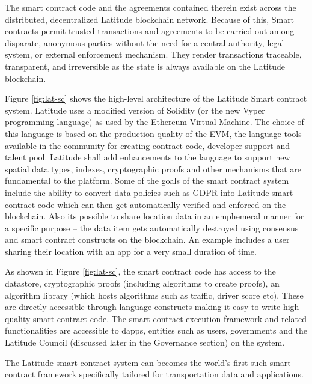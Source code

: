 The smart contract code and the agreements contained therein exist across the distributed, decentralized Latitude
blockchain network.  Because of this, Smart contracts permit trusted transactions and agreements to be carried out among
disparate, anonymous parties without the need for a central authority, legal system, or external enforcement mechanism.
They render transactions traceable, transparent, and irreversible as the state is always available on the Latitude
blockchain.

Figure \ref{fig:lat-sc} shows the high-level architecture of the Latitude Smart contract system. Latitude uses a
modified version of Solidity (or the new Vyper programming language) as used by the Ethereum Virtual Machine. The choice
of this language is based on the production quality of the EVM, the language tools available in the community for
creating contract code, developer support and talent pool. Latitude shall add enhancements to the language to support
new spatial data types, indexes, cryptographic proofs and other mechanisms that are fundamental to the platform. Some of
the goals of the smart contract system include the ability to convert data policies such as GDPR \cite{gdpr} into
Latitude smart contract code which can then get automatically verified and enforced on the blockchain.  Also its
possible to share location data in an emphemeral manner for a specific purpose -- the data item gets automatically
destroyed using consensus and smart contract constructs on the blockchain. An example includes a user sharing their
location with an app for a very small duration of time.

As showsn in Figure \ref{fig:lat-sc}, the smart contract code has access to the datastore, cryptographic proofs
(including algorithms to create proofs), an algorithm library (which hosts algorithms such as traffic, driver score
etc). These are directly accessible through language constructs making it easy to write high quality smart contract
code. The smart contract execution framework and related functionalities are accessible to dapps, entities such as
users, governments and the Latitude Council (discussed later in the Governance section) on the system. 

The Latitude smart contract system can becomes the world's first such smart contract framework specifically tailored for
transportation data and applications.



